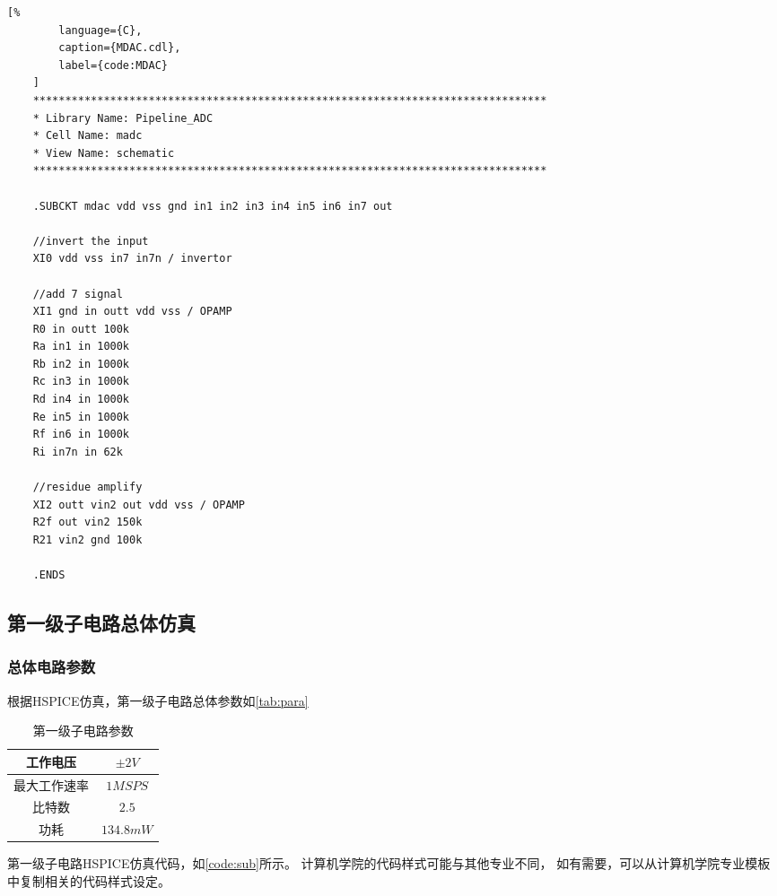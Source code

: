     \begin{lstlisting}[%
        language={C},
        caption={MDAC.cdl},
        label={code:MDAC}
    ]
    ********************************************************************************
    * Library Name: Pipeline_ADC
    * Cell Name: madc
    * View Name: schematic
    ********************************************************************************

    .SUBCKT mdac vdd vss gnd in1 in2 in3 in4 in5 in6 in7 out

    //invert the input
    XI0 vdd vss in7 in7n / invertor

    //add 7 signal
    XI1 gnd in outt vdd vss / OPAMP
    R0 in outt 100k
    Ra in1 in 1000k
    Rb in2 in 1000k
    Rc in3 in 1000k
    Rd in4 in 1000k
    Re in5 in 1000k
    Rf in6 in 1000k
    Ri in7n in 62k

    //residue amplify
    XI2 outt vin2 out vdd vss / OPAMP
    R2f out vin2 150k
    R21 vin2 gnd 100k

    .ENDS
    \end{lstlisting}



\subsection{第一级子电路总体仿真}
    \subsubsection{总体电路参数}
    根据HSPICE仿真，第一级子电路总体参数如\autoref{tab:para}
    \begin{table}[ht]
        \centering
        \caption{\label{tab:para}第一级子电路参数}
        \begin{tabular}{|c|c|}
            \hline
            工作电压 & $ \pm 2V $ \\ \hline
            最大工作速率 & $1MSPS$ \\ \hline
            比特数 & $2.5$  \\ \hline
            功耗 & $134.8mW$  \\ \hline
        \end{tabular}
    \end{table}
    \par 第一级子电路HSPICE仿真代码，如\autoref{code:sub}所示。
    计算机学院的代码样式可能与其他专业不同，
    如有需要，可以从计算机学院专业模板中复制相关的代码样式设定。

